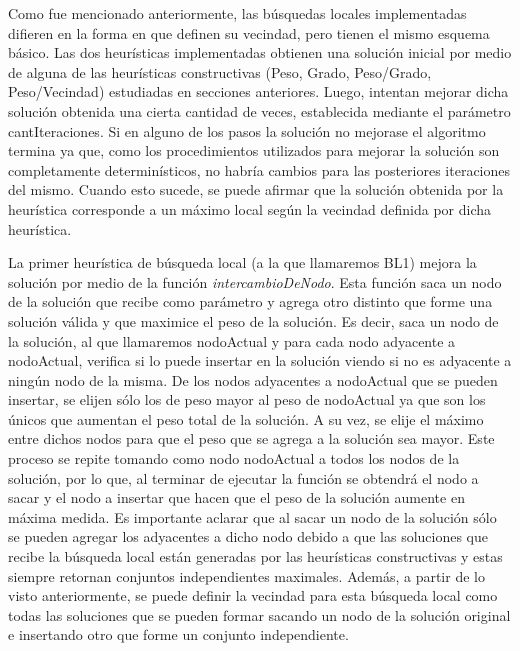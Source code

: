 \documentclass[a4paper,11pt] {article}
\begin{document}
Como fue mencionado anteriormente, las b\'usquedas locales implementadas difieren en la forma en que definen su vecindad, pero tienen el mismo esquema b\'asico. Las dos heur\'isticas implementadas obtienen una soluci\'on inicial por medio de alguna de las heur\'isticas constructivas (Peso, Grado, Peso/Grado, Peso/Vecindad) estudiadas en secciones anteriores. Luego, intentan mejorar dicha soluci\'on obtenida una cierta cantidad de veces, establecida mediante el par\'ametro cantIteraciones. Si en alguno de los pasos la soluci\'on no mejorase el algoritmo termina ya que, como los procedimientos utilizados para mejorar la soluci\'on son completamente determin\'isticos, no habr\'ia cambios para las posteriores iteraciones del mismo. Cuando esto sucede, se puede afirmar que la soluci\'on obtenida por la heur\'istica corresponde a un m\'aximo local seg\'un la vecindad definida por dicha heur\'istica.

La primer heur\'istica de b\'usqueda local (a la que llamaremos BL1) mejora la soluci\'on por medio de la funci\'on \textit{intercambioDeNodo}. Esta funci\'on saca un nodo de la soluci\'on que recibe como par\'ametro y agrega otro distinto que forme una soluci\'on v\'alida y que maximice el peso de la soluci\'on. Es decir, saca un nodo de la soluci\'on, al que llamaremos nodoActual y para cada nodo adyacente a nodoActual, verifica si lo puede insertar en la soluci\'on viendo si no es adyacente a ning\'un nodo de la misma. De los nodos adyacentes a nodoActual que se pueden insertar, se elijen s\'olo los de peso mayor al peso de nodoActual ya que son los \'unicos que aumentan el peso total de la soluci\'on. A su vez, se elije el m\'aximo entre dichos nodos para que el peso que se agrega a la soluci\'on sea mayor. Este proceso se repite tomando como nodo nodoActual a todos los nodos de la soluci\'on, por lo que, al terminar de ejecutar la funci\'on se obtendr\'a el nodo a sacar y el nodo a insertar que hacen que el peso de la soluci\'on aumente en m\'axima medida. Es importante aclarar que al sacar un nodo de la soluci\'on s\'olo se pueden agregar los adyacentes a dicho nodo debido a que las soluciones que recibe la b\'usqueda local est\'an generadas por las heur\'isticas constructivas y estas siempre retornan conjuntos independientes maximales. Adem\'as, a partir de lo visto anteriormente, se puede definir la vecindad para esta b\'usqueda local como todas las soluciones que se pueden formar sacando un nodo de la soluci\'on original e insertando otro que forme un conjunto independiente.
\end{document}

